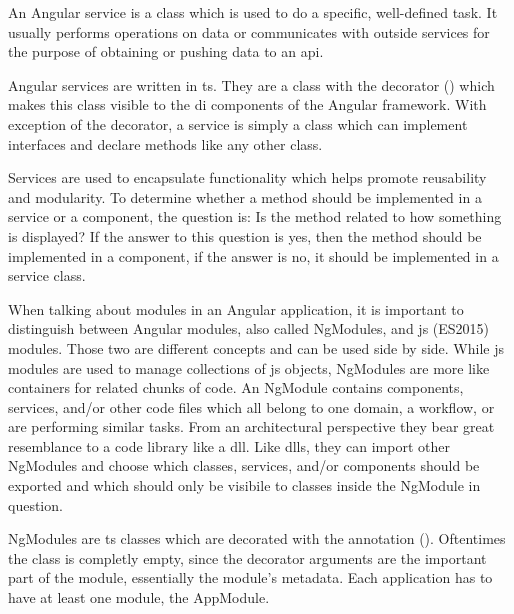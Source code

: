 
\cite{angularTemplateSyntax}




An Angular service is a class which is used to do a specific, well-defined task. It usually performs operations on data or communicates with outside services for the purpose of obtaining or pushing data to an \gls{api}.


Angular services are written in \gls{ts}. They are a class with the  decorator () which makes this class visible to the \gls{di} components of the Angular framework. With exception of the decorator, a service is simply a class which can implement interfaces and declare methods like any other class.

Services are used to encapsulate functionality which helps promote reusability and modularity. To determine whether a method should be implemented in a service or a component, the question is: Is the method related to how something is displayed? If the answer to this question is yes, then the method should be implemented in a component, if the answer is no, it should be implemented in a service class.



When talking about modules in an Angular application, it is important to distinguish between Angular modules, also called NgModules, and \gls{js} (ES2015) modules. Those two are different concepts and can be used side by side. While \gls{js} modules are used to manage collections of \gls{js} objects, NgModules are more like containers for related chunks of code. An NgModule contains components, services, and/or other code files which all belong to one domain, a workflow, or are performing similar tasks. From an architectural perspective they bear great resemblance to a code library like a \gls{dll}. Like \gls{dll}s, they can import other NgModules and choose which classes, services, and/or components should be exported and which should only be visibile to classes inside the NgModule in question.


NgModules are \gls{ts} classes which are decorated with the  annotation (). Oftentimes the class is completly empty, since the decorator arguments are the important part of the module, essentially the module's metadata. Each application has to have at least one module, the AppModule.

